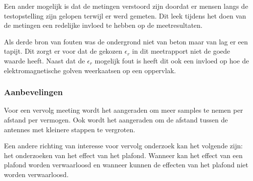 Een ander mogelijk is dat de metingen verstoord zijn doordat er mensen langs de testopstelling zijn gelopen terwijl er werd gemeten. Dit leek tijdens het doen van de metingen een redelijke invloed te hebben op de meetresultaten.

Als derde bron van fouten was de ondergrond niet van beton maar van lag er een tapijt. Dit zorgt er voor dat de gekozen $\epsilon_r$ in dit meetrapport niet de goede waarde heeft. Naast dat de $\epsilon_r$ mogelijk fout is heeft dit ook een invloed op hoe de elektromagnetische golven weerkaatsen op een oppervlak.

\subsubsection{Aanbevelingen}
Voor een vervolg meeting wordt het aangeraden om meer samples te nemen per afstand per vermogen. Ook wordt het aangeraden om de afstand tussen de antennes met kleinere stappen te vergroten.

Een andere richting van interesse voor vervolg onderzoek kan het volgende zijn: het onderzoeken van het effect van het plafond. Wanneer kan het effect van een plafond worden verwaarloosd en wanneer kunnen de effecten van het plafond niet worden verwaarloosd.